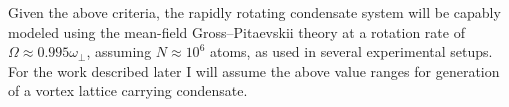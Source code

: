 Given the above criteria, the rapidly rotating condensate system will be capably modeled using the mean-field Gross--Pitaevskii theory at a rotation rate of $\Omega \approx 0.995\omega_{\perp}$, assuming $N\approx 10^6$ atoms, as used in several experimental setups. For the work described later I will assume the above value ranges for generation of a vortex lattice carrying condensate.




